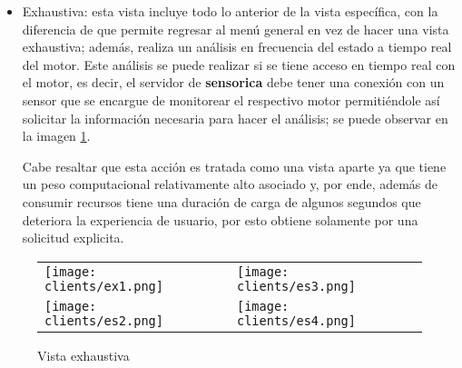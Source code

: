 \begin{itemize}
    \item Exhaustiva: esta vista incluye todo lo anterior de la vista específica,
        con la diferencia de que permite regresar al menú general en vez de hacer
        una vista exhaustiva; además, realiza un análisis en frecuencia
        del estado a tiempo real del motor. Este análisis se puede realizar si
        se tiene acceso en tiempo real con el motor, es decir,
        el servidor de \textbf{sensorica} debe tener una conexión con un sensor que se
        encargue de monitorear el respectivo motor permitiéndole así solicitar
        la información necesaria para hacer el análisis;
        se puede observar en la imagen \ref{img:VistaExhaustiva}.

        Cabe resaltar que esta acción es tratada como una vista aparte ya que
        tiene un peso computacional relativamente alto asociado y, por ende,
        además de consumir recursos tiene una duración de carga de algunos
        segundos que deteriora la experiencia de usuario, por esto
        obtiene solamente por una solicitud explicita.
\end{itemize}





\begin{center}
    \begin{figure}[ht]
		\centering
        \caption{Vista exhaustiva}
            \begin{tabular}{m{6cm}m{6cm}}
                \texttt{[image: clients/ex1.png]}&
        \texttt{[image: clients/es3.png]}\\
                \texttt{[image: clients/es2.png]}&
        \texttt{[image: clients/es4.png]}\\
            \end{tabular}
        \label{img:VistaExhaustiva}
	\end{figure}
\end{center}


